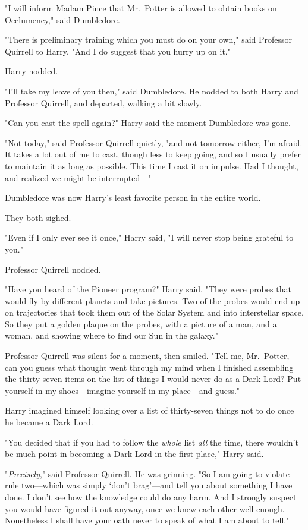 "I will inform Madam Pince that Mr.~Potter is allowed to obtain books on
Occlumency," said Dumbledore.

"There is preliminary training which you must do on your own," said Professor
Quirrell to Harry. "And I do suggest that you hurry up on it."

Harry nodded.

"I'll take my leave of you then," said Dumbledore. He nodded to both Harry and
Professor Quirrell, and departed, walking a bit slowly.

"Can you cast the spell again?" Harry said the moment Dumbledore was gone.

"Not today," said Professor Quirrell quietly, "and not tomorrow either, I'm
afraid. It takes a lot out of me to cast, though less to keep going, and so I
usually prefer to maintain it as long as possible. This time I cast it on
impulse. Had I thought, and realized we might be interrupted\mbox{---}"

Dumbledore was now Harry's least favorite person in the entire world.

They both sighed.

"Even if I only ever see it once," Harry said, "I will never stop being
grateful to you."

Professor Quirrell nodded.

"Have you heard of the Pioneer program?" Harry said. "They were probes that
would fly by different planets and take pictures. Two of the probes would end
up on trajectories that took them out of the Solar System and into interstellar
space. So they put a golden plaque on the probes, with a picture of a man, and
a woman, and showing where to find our Sun in the galaxy."

Professor Quirrell was silent for a moment, then smiled. "Tell me, Mr.~Potter,
can you guess what thought went through my mind when I finished assembling the
thirty-seven items on the list of things I would never do as a Dark Lord? Put
yourself in my shoes---imagine yourself in my place---and guess."

Harry imagined himself looking over a list of thirty-seven things not to do
once he became a Dark Lord.

"You decided that if you had to follow the \emph{whole} list \emph{all} the
time, there wouldn't be much point in becoming a Dark Lord in the first place,"
Harry said.

"\emph{Precisely}," said Professor Quirrell. He was grinning. "So I am going to
violate rule two---which was simply `don't brag'---and tell you about something
I have done. I don't see how the knowledge could do any harm. And I strongly
suspect you would have figured it out anyway, once we knew each other well
enough. Nonetheless{\el} I shall have your oath never to speak of what I am
about to tell."

